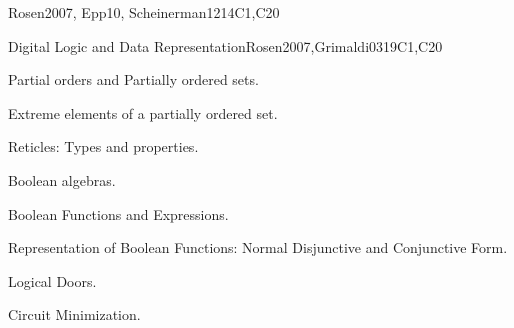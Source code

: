 \begin{syllabus}
\begin{unit}{\DSProofTechniques}{}{Rosen2007, Epp10, Scheinerman12}{14}{C1,C20}
\begin{topics}
        \item \DSProofTechniquesTopicNotions%
        \item \DSProofTechniquesTopicThe%
        \item \DSProofTechniquesTopicDirect%
        \item \DSProofTechniquesTopicDisproving%
        \item \DSProofTechniquesTopicProof%
        \item \DSProofTechniquesTopicInduction%
        \item \DSProofTechniquesTopicStructural%
        \item \DSProofTechniquesTopicWeak%
        \item \DSProofTechniquesTopicRecursive%
        \item \DSProofTechniquesTopicWell%
\end{topics}

\begin{learningoutcomes}
	\item \DSProofTechniquesLOIdentifyTheUsed [\Assessment]
	\item \DSProofTechniquesLOOutline [\Usage ]
	\item \DSProofTechniquesLOApplyEach [\Usage ]
	\item \DSProofTechniquesLODetermineWhich [\Assessment]
	\item \DSProofTechniquesLOExplainTheIdeas [\Familiarity ]
	\item \DSProofTechniquesLOExplainTheWeak [\Assessment]
	\item \DSProofTechniquesLOStateThe [\Familiarity]
\end{learningoutcomes}
\end{unit}

\begin{unit}{Digital Logic and Data Representation}{}{Rosen2007,Grimaldi03}{19}{C1,C20}
   \begin{topics}
	\item Partial orders and Partially ordered sets.   
 	\item Extreme elements of a partially ordered set.
	\item Reticles: Types and properties.
	\item Boolean algebras.
	\item Boolean Functions and Expressions.
	\item Representation of Boolean Functions: Normal Disjunctive and Conjunctive Form.
	\item Logical Doors.
	\item Circuit Minimization.
   \end{topics}


\end{unit}
\end{syllabus}
